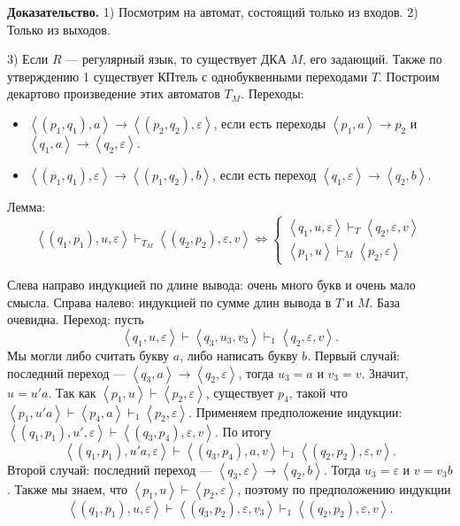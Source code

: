 \textbf{Доказательство.} 1) Посмотрим на автомат, состоящий только из входов. 2) Только из выходов.

3) Если $R$ --- регулярный язык, то существует ДКА $M$, его задающий. Также по утверждению 1 существует КПтель с однобуквенными переходами $T$.
Построим декартово произведение этих автоматов $T_M$.
Переходы: 
\begin{itemize}
    \item $\left<(p_1, q_1), a \right> \to \left<(p_2, q_2), \varepsilon \right>$, если есть переходы $\left<p_1, a \right> \to p_2$ и $\left<q_1, a \right> \to \left<q_2, \varepsilon \right>$.

    \item $\left<(p_1, q_1), \varepsilon \right> \to \left<(p_1, q_2), b \right>$, если есть переход $\left<q_1, \varepsilon \right> \to \left<q_2, b \right>$.
\end{itemize}
Лемма:
\[
    \left<(q_1, p_1), u, \varepsilon \right> \vdash_{T_M} \left<(q_2, p_2), \varepsilon, v \right> \iff
    \begin{cases}
        \left< q_1, u, \varepsilon \right> \vdash_T \left< q_2, \varepsilon, v \right> \\
        \left< p_1, u \right> \vdash_M \left< p_2, \varepsilon \right>
    \end{cases}
\]

Слева направо индукцией по длине вывода: очень много букв и очень мало смысла. 
Справа налево: индукцией по сумме длин вывода в $T$ и $M$.
База очевидна. Переход: пусть
\[
    \left< q_1, u, \varepsilon \right> \vdash \left< q_3, u_3, v_3 \right> \vdash_1 \left< q_2, \varepsilon, v \right>.
\]
Мы могли либо считать букву $a$, либо написать букву $b$.
Первый случай: последний переход --- $\left< q_3, a \right> \to \left< q_2, \varepsilon \right>$, тогда $u_3 = a$ и $v_3 = v$.
Значит, $u = u'a$. Так как $\left< p_1, u \right> \vdash \left<p_2, \varepsilon \right>$, существует $p_4$, такой что $\left< p_1, u'a \right> \vdash \left<p_4, a \right> \vdash_1 \left< p_2, \varepsilon \right>$.
Применяем предположение индукции: $\left<(q_1, p_1), u', \varepsilon \right> \vdash \left<(q_3, p_4), \varepsilon, v \right>$.
По итогу
\[
    \left<(q_1, p_1), u'a, \varepsilon \right> \vdash \left<(q_3, p_4), a, v \right> \vdash_1 \left<(q_2, p_2), \varepsilon, v \right>.
\]
Второй случай: последний переход --- $\left<q_3, \varepsilon \right> \to \left<q_2, b \right>$.
Тогда $u_3 = \varepsilon$ и $v = v_3b$.
Также мы знаем, что $\left<p_1, u \right> \vdash \left<p_2, \varepsilon \right>$, поэтому по предположению индукции
\[
    \left<(q_1, p_1), u, \varepsilon \right> \vdash \left<(q_3, p_2), \varepsilon, v_3 \right> \vdash_1 \left<(q_2, p_2), \varepsilon, v \right>.
\]


